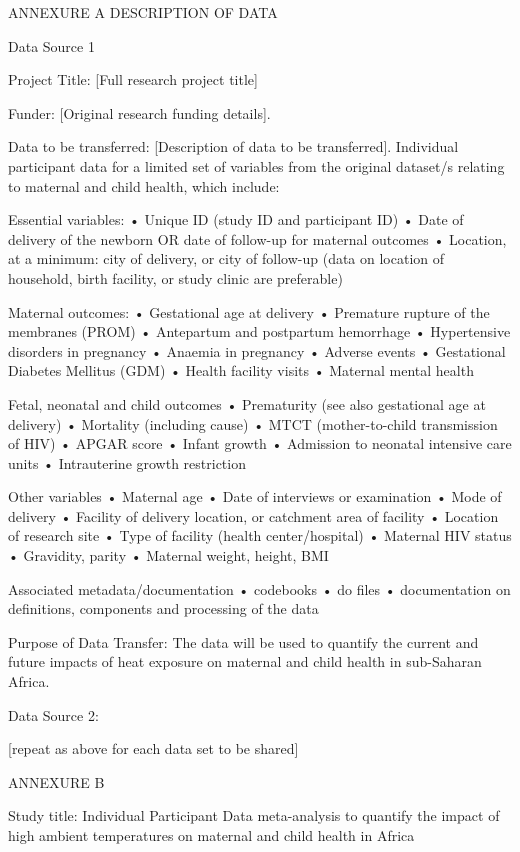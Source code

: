 \documentclass[12pt,letterpaper]{article}
\begin{document}
ANNEXURE A DESCRIPTION OF DATA

Data Source 1

Project Title: [Full research project title]	

Funder: [Original research funding details].		

Data to be transferred: [Description of data to be transferred].  Individual participant data for a limited set of variables from the original dataset/s relating to maternal and child health, which include:

Essential variables: •	Unique ID (study ID and participant ID) •	Date of delivery of the newborn OR date of follow-up for maternal outcomes •	Location, at a minimum: city of delivery, or city of follow-up (data on location of household, birth facility, or study clinic are preferable)

Maternal outcomes: •	Gestational age at delivery •	Premature rupture of the membranes (PROM) •	Antepartum and postpartum hemorrhage •	Hypertensive disorders in pregnancy •	Anaemia in pregnancy •	Adverse events •	Gestational Diabetes Mellitus (GDM) •	Health facility visits  •	Maternal mental health

Fetal, neonatal and child outcomes •	Prematurity (see also gestational age at delivery) •	Mortality (including cause) •	MTCT (mother-to-child transmission of HIV) •	APGAR score •	Infant growth •	Admission to neonatal intensive care units •	Intrauterine growth restriction

Other variables •	Maternal age •	Date of interviews or examination •	Mode of delivery •	Facility of delivery location, or catchment area of facility •	Location of research site •	Type of facility (health center/hospital) •	Maternal HIV status •	Gravidity, parity •	Maternal weight, height, BMI

Associated metadata/documentation •	codebooks •	do files •	documentation on definitions, components and processing of the data

Purpose of Data Transfer: The data will be used to quantify the current and future impacts of heat exposure on maternal and child health in sub-Saharan Africa.

Data Source 2:

[repeat as above for each data set to be shared]

ANNEXURE B

Study title: Individual Participant Data meta-analysis to quantify the impact of high ambient temperatures on maternal and child health in Africa
\end{document}
